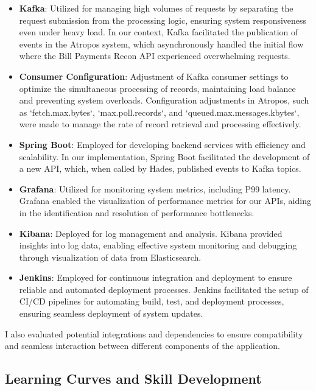 \documentclass[12pt,a4paper]{report}
\begin{document}
\begin{itemize}
    \item \textbf{Kafka}: Utilized for managing high volumes of requests by separating the request submission from the processing logic, ensuring system responsiveness even under heavy load. In our context, Kafka facilitated the publication of events in the Atropos system, which asynchronously handled the initial flow where the Bill Payments Recon API experienced overwhelming requests.
    
    \item \textbf{Consumer Configuration}: Adjustment of Kafka consumer settings to optimize the simultaneous processing of records, maintaining load balance and preventing system overloads. Configuration adjustments in Atropos, such as `fetch.max.bytes`, `max.poll.records`, and `queued.max.messages.kbytes`, were made to manage the rate of record retrieval and processing effectively.
    
    \item \textbf{Spring Boot}: Employed for developing backend services with efficiency and scalability. In our implementation, Spring Boot facilitated the development of a new API, which, when called by Hades, published events to Kafka topics.
    
    \item \textbf{Grafana}: Utilized for monitoring system metrics, including P99 latency. Grafana enabled the visualization of performance metrics for our APIs, aiding in the identification and resolution of performance bottlenecks.
    
    \item \textbf{Kibana}: Deployed for log management and analysis. Kibana provided insights into log data, enabling effective system monitoring and debugging through visualization of data from Elasticsearch.
    
    \item \textbf{Jenkins}: Employed for continuous integration and deployment to ensure reliable and automated deployment processes. Jenkins facilitated the setup of CI/CD pipelines for automating build, test, and deployment processes, ensuring seamless deployment of system updates.
\end{itemize}

I also evaluated potential integrations and dependencies to ensure compatibility and seamless interaction between different components of the application.

\subsection{Learning Curves and Skill Development}
\end{document}
